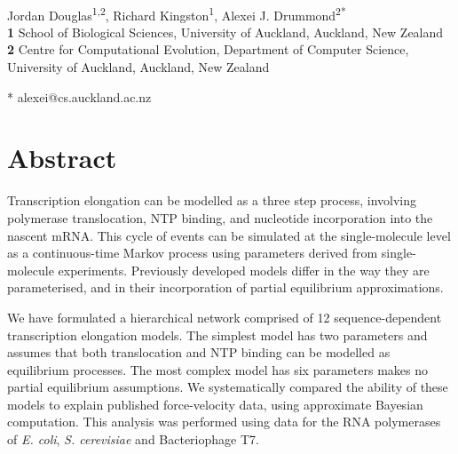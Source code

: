 \documentclass[10pt,letterpaper]{article}
\begin{document}
\vspace*{0.2in}

\begin{flushleft}
{\Large
\textbf{} %
}
\newline
\\
Jordan Douglas\textsuperscript{1,2},
Richard Kingston\textsuperscript{1},
Alexei J. Drummond\textsuperscript{2*}
\\
\bigskip
\textbf{1} School of Biological Sciences, University of Auckland, Auckland, New Zealand
\\
\textbf{2} Centre for Computational Evolution, Department of Computer Science, University of Auckland, Auckland, New Zealand
\\
\bigskip


* alexei@cs.auckland.ac.nz


\end{flushleft}
\section*{Abstract}

Transcription elongation can be modelled as a three step process, involving polymerase translocation, NTP binding, and nucleotide incorporation into the nascent mRNA. This cycle of events can be simulated at the single-molecule level as a continuous-time Markov process using parameters derived from single-molecule experiments. Previously developed models differ in the way they are parameterised, and in their incorporation of partial equilibrium approximations.

We have formulated a hierarchical network comprised of 12 sequence-dependent transcription elongation models. The simplest model has two parameters and assumes that both translocation and NTP binding can be modelled as equilibrium processes. The most complex model has six parameters makes no partial equilibrium assumptions. We systematically compared the ability of these models to explain published force-velocity data, using approximate Bayesian computation. This analysis was performed using data for the RNA polymerases of {\it E. coli}, {\it S. cerevisiae} and Bacteriophage T7.
\end{document}
